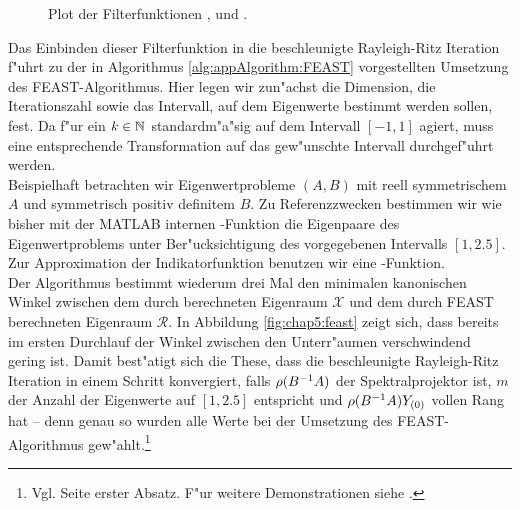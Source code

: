 \newpage

\begin{figure}[h!]
\centering


\caption{Plot der Filterfunktionen ,  und .}\label{fig:chap5:ratFun}
\end{figure}

Das Einbinden dieser Filterfunktion in die beschleunigte Rayleigh-Ritz Iteration f"uhrt zu der in Algorithmus \ref{alg:appAlgorithm:FEAST} vorgestellten Umsetzung des FEAST-Algorithmus. Hier legen wir zun"achst die Dimension, die Iterationszahl sowie das Intervall, auf dem Eigenwerte bestimmt werden sollen, fest. Da  f"ur ein $k\in\mathbb{N}$ standardm"a"sig auf dem Intervall $[-1,1]$ agiert, muss eine entsprechende Transformation auf das gew"unschte Intervall durchgef"uhrt werden.\\

Beispielhaft betrachten wir Eigenwertprobleme $(A,B)$ mit reell symmetrischem $A$ und symmetrisch positiv definitem $B$.
Zu Referenzzwecken bestimmen wir wie bisher mit der MATLAB internen -Funktion die Eigenpaare des Eigenwertproblems unter Ber"ucksichtigung des vorgegebenen Intervalls $[1,2.5]$. Zur Approximation der Indikatorfunktion benutzen wir eine -Funktion.\\

Der Algorithmus bestimmt wiederum drei Mal den minimalen kanonischen Winkel zwischen dem durch  berechneten Eigenraum $\mathcal{X}$ und dem durch FEAST berechneten Eigenraum $\mathcal{R}$. In Abbildung \ref{fig:chap5:feast} zeigt sich, dass bereits im ersten Durchlauf der Winkel zwischen den Unterr"aumen verschwindend gering ist. Damit best"atigt sich die These, dass die beschleunigte Rayleigh-Ritz Iteration in einem Schritt konvergiert, falls $\rho(B^{-1}A)$ der Spektralprojektor ist, $m$ der Anzahl der Eigenwerte auf $[1,2.5]$ entspricht und $\rho(B^{-1}A)Y_{(0)}$ vollen Rang hat -- denn genau so wurden alle Werte bei der Umsetzung des FEAST-Algorithmus gew"ahlt.\footnote{Vgl. Seite \pageref{eq:quadratur} erster Absatz. F"ur weitere Demonstrationen siehe \cite{feast}.}


